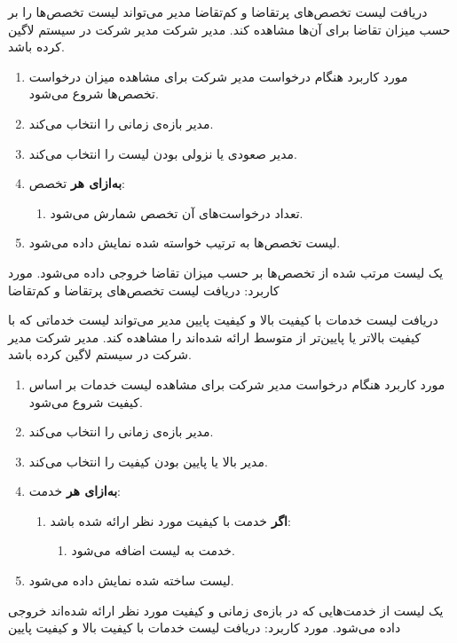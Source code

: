 {
\usecase
{دریافت لیست تخصص‌های پرتقاضا و کم‌تقاضا}
{}
{مدیر می‌تواند لیست تخصص‌ها را بر حسب میزان تقاضا برای آن‌ها مشاهده کند.}
{مدیر شرکت}
{}
{مدیر شرکت در سیستم لاگین کرده باشد.}
{
	\vspace*{-0.6cm}
	\begin{enumerate}
		\item 
		مورد کاربرد هنگام درخواست مدیر شرکت برای مشاهده میزان درخواست تخصص‌ها شروع می‌شود.
		\item
		مدیر بازه‌ی زمانی را انتخاب می‌کند.
		\item
		مدیر صعودی یا نزولی بودن لیست را انتخاب می‌کند.
		\item
		\textbf{به‌ازای هر} تخصص:
		\begin{enumerate}[label=\theenumi.\arabic*.]
			\item تعداد درخواست‌های آن تخصص شمارش می‌شود.
		\end{enumerate}
		\item
		لیست تخصص‌ها به ترتیب خواسته شده نمایش داده می‌شود.
	\end{enumerate}
}
{یک لیست مرتب شده از تخصص‌ها بر حسب میزان تقاضا خروجی داده می‌شود.}
{
}
{
	مورد کاربرد: دریافت لیست تخصص‌های پرتقاضا و کم‌تقاضا
}
}

{
\usecase
{دریافت لیست خدمات با کیفیت بالا و کیفیت پایین}
{}
{مدیر می‌تواند لیست خدماتی که با کیفیت بالاتر یا پایین‌تر از متوسط ارائه شده‌اند را مشاهده کند.}
{مدیر شرکت}
{}
{مدیر شرکت در سیستم لاگین کرده باشد.}
{
	\vspace*{-0.6cm}
	\begin{enumerate}
		\item 
		مورد کاربرد هنگام درخواست مدیر شرکت برای مشاهده لیست خدمات بر اساس کیفیت شروع می‌شود.
		\item
		مدیر بازه‌ی زمانی را انتخاب می‌کند.
		\item
		مدیر بالا یا پایین بودن کیفیت را انتخاب می‌کند.
		\item
		\textbf{به‌ازای هر} خدمت:
		\begin{enumerate}[label=\theenumi.\arabic*.]
			\item 
			\textbf{اگر} خدمت با کیفیت مورد نظر ارائه شده باشد:
			\begin{enumerate}
				\item 
				خدمت به لیست اضافه می‌شود.
			\end{enumerate}
		\end{enumerate}
		\item
		لیست ساخته شده نمایش داده می‌شود.
	\end{enumerate}
}
{یک لیست از خدمت‌هایی که در بازه‌ی زمانی و کیفیت مورد نظر ارائه شده‌اند خروجی داده می‌شود.}
{
}
{
	مورد کاربرد: دریافت لیست خدمات با کیفیت بالا و کیفیت پایین
}
}

